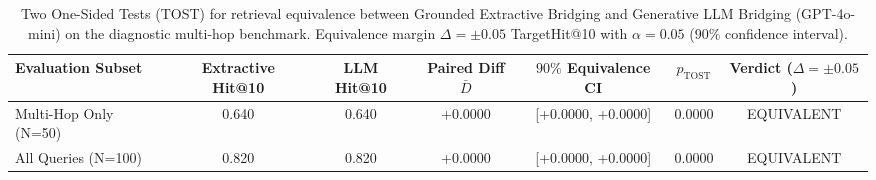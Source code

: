 \begin{table}[htbp]
\centering
\small
\caption{Two One-Sided Tests (TOST) for retrieval equivalence between Grounded Extractive Bridging and Generative LLM Bridging (GPT-4o-mini) on the diagnostic multi-hop benchmark. Equivalence margin $\Delta = \pm 0.05$ TargetHit@10 with $\alpha=0.05$ ($90\%$ confidence interval).}
\label{tab:multihop_equivalence_v2}
\begin{tabular}{lcccccc}
\toprule
Evaluation Subset & Extractive Hit@10 & LLM Hit@10 & Paired Diff $\bar{D}$ & $90\%$ Equivalence CI & $p_{\text{TOST}}$ & Verdict ($\Delta=\pm 0.05$) \\
\midrule
Multi-Hop Only (N=50) & 0.640 & 0.640 & +0.0000 & [+0.0000, +0.0000] & 0.0000 & EQUIVALENT \\
All Queries (N=100) & 0.820 & 0.820 & +0.0000 & [+0.0000, +0.0000] & 0.0000 & EQUIVALENT \\
\bottomrule
\end{tabular}
\end{table}
